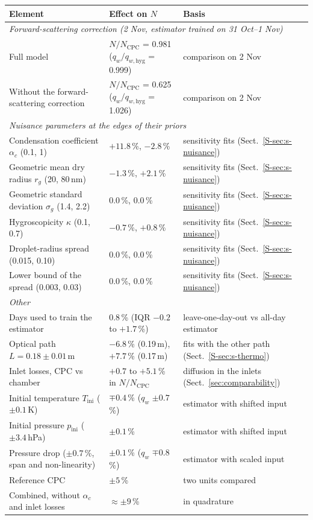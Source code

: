 \begin{tabular}{lll}
\toprule
Element & Effect on $N$ & Basis \\
\midrule
\multicolumn{3}{l}{\textit{Forward-scattering correction (2 Nov, estimator trained on 31 Oct--1 Nov)}} \\
Full model & $N/N_\mathrm{CPC}$ = 0.981 ($q_w/q_{w,\mathrm{hyg}}$ = 0.999) & comparison on 2 Nov \\
Without the forward-scattering correction & $N/N_\mathrm{CPC}$ = 0.625 ($q_w/q_{w,\mathrm{hyg}}$ = 1.026) & comparison on 2 Nov \\
\multicolumn{3}{l}{\textit{Nuisance parameters at the edges of their priors}} \\
Condensation coefficient $\alpha_c$ (0.1, 1) & $+11.8$\,\%, $-2.8$\,\% & sensitivity fits (Sect.~\ref{S-sec:s-nuisance}) \\
Geometric mean dry radius $r_g$ (20, 80\,nm) & $-1.3$\,\%, $+2.1$\,\% & sensitivity fits (Sect.~\ref{S-sec:s-nuisance}) \\
Geometric standard deviation $\sigma_g$ (1.4, 2.2) & 0.0\,\%, 0.0\,\% & sensitivity fits (Sect.~\ref{S-sec:s-nuisance}) \\
Hygroscopicity $\kappa$ (0.1, 0.7) & $-0.7$\,\%, $+0.8$\,\% & sensitivity fits (Sect.~\ref{S-sec:s-nuisance}) \\
Droplet-radius spread (0.015, 0.10) & 0.0\,\%, 0.0\,\% & sensitivity fits (Sect.~\ref{S-sec:s-nuisance}) \\
Lower bound of the spread (0.003, 0.03) & 0.0\,\%, 0.0\,\% & sensitivity fits (Sect.~\ref{S-sec:s-nuisance}) \\
\multicolumn{3}{l}{\textit{Other}} \\
Days used to train the estimator & 0.8\,\% (IQR $-0.2$ to $+1.7$\,\%) & leave-one-day-out vs all-day estimator \\
Optical path $L = 0.18 \pm 0.01$\,m & $-6.8$\,\% (0.19\,m), $+7.7$\,\% (0.17\,m) & fits with the other path (Sect.~\ref{S-sec:s-thermo}) \\
Inlet losses, CPC vs chamber & $+0.7$ to $+5.1$\,\% in $N/N_\mathrm{CPC}$ & diffusion in the inlets (Sect.~\ref{sec:comparability}) \\
Initial temperature $T_\mathrm{ini}$ ($\pm0.1$\,K) & $\mp0.4$\,\% ($q_w$ $\pm0.7$\,\%) & estimator with shifted input \\
Initial pressure $p_\mathrm{ini}$ ($\pm3.4$\,hPa) & $\pm0.1$\,\% & estimator with shifted input \\
Pressure drop ($\pm0.7$\,\%, span and non-linearity) & $\pm0.1$\,\% ($q_w$ $\mp0.8$\,\%) & estimator with scaled input \\
Reference CPC & $\pm5$\,\% & two units compared \\
\midrule
Combined, without $\alpha_c$ and inlet losses & $\approx\pm9$\,\% & in quadrature \\
\bottomrule
\end{tabular}
